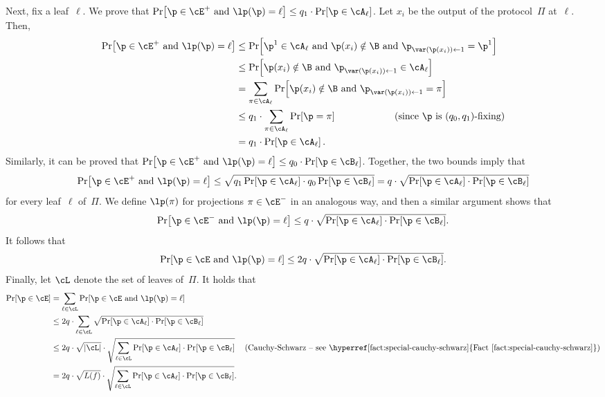 \documentclass[11pt]{article}
\numberwithin{equation}{section}
\theoremstyle{definition}
\theoremstyle{plain}
\newcommand{\expref}[2]{\hyperref[#2]{#1~\ref{#2}}}
\theoremstyle{definition}\newtheorem{notation}[theorem]{Notation}\theoremstyle{plain}
\begin{document}
Next, fix a leaf~$\ell$. We prove that $\Pr\!\left[\p\in\cE^{+}\text{ and }\lp(\p)=\ell\right]\le q_{1}\cdot\Pr\!\left[\p\in\cA_{\ell}\right]$.
Let $x_{i}$ be the output of the protocol~$\Pi$ at~$\ell$. Then,
\begin{align*}
\Pr\!\left[\p\in\cE^{+}\text{ and }\lp(\p)=\ell\right] & \le\Pr\!\left[\p^{1}\in\cA_{\ell}\text{ and }\p(x_{i})\notin\B\text{ and }\p_{\var(\p(x_{i}))\gets1}=\p^{1}\right]\\
 & \le\Pr\!\left[\p(x_{i})\notin\B\text{ and }\p_{\var(\p(x_{i}))\gets1}\in\cA_{\ell}\right]\\
 & =\sum_{\pi\in\cA_{\ell}}\Pr\!\left[\p(x_{i})\notin\B\text{ and }\p_{\var(\p(x_{i}))\gets1}=\pi\right]\\
 & \le q_{1}\cdot\sum_{\pi\in\cA_{\ell}}\Pr\!\left[\p=\pi\right]\qquad\qquad\qquad\text{(since \ensuremath{\p} is \ensuremath{(q_{0},q_{1})}-fixing)}\\
 & =q_{1}\cdot\Pr\!\left[\p\in\cA_{\ell}\right].
\end{align*}
Similarly, it can be proved that $\Pr\!\left[\p\in\cE^{+}\text{ and }\lp(\p)=\ell\right]\le q_{0}\cdot\Pr\!\left[\p\in\cB_{\ell}\right]$.
Together, the two bounds imply that 
\[
\Pr\!\left[\p\in\cE^{+}\text{ and }\lp(\p)=\ell\right]\le\sqrt{q_{1}\Pr\!\left[\p\in\cA_{\ell}\right]\cdot q_{0}\Pr\!\left[\p\in\cB_{\ell}\right]}=q\cdot\sqrt{\Pr\!\left[\p\in\cA_{\ell}\right]\cdot\Pr\!\left[\p\in\cB_{\ell}\right]}
\]
for every leaf~$\ell$ of~$\Pi$. We define $\lp(\pi)$ for projections
$\pi\in\cE^{-}$ in an analogous way, and then a similar argument
shows that 
\[
\Pr\!\left[\p\in\cE^{-}\text{ and }\lp(\p)=\ell\right]\le q\cdot\sqrt{\Pr\!\left[\p\in\cA_{\ell}\right]\cdot\Pr\!\left[\p\in\cB_{\ell}\right]}.
\]
It follows that 
\[
\Pr\!\left[\p\in\cE\text{ and }\lp(\p)=\ell\right]\le2q\cdot\sqrt{\Pr\!\left[\p\in\cA_{\ell}\right]\cdot\Pr\!\left[\p\in\cB_{\ell}\right]}.
\]
Finally, let $\cL$ denote the set of leaves of~$\Pi$. It holds
that 
\begin{align*}
\Pr\!\left[\p\in\cE\right] & =\sum_{\ell\in\cL}\Pr\!\left[\p\in\cE\text{ and }\lp(\p)=\ell\right]\\
 & \le2q\cdot\sum_{\ell\in\cL}\sqrt{\Pr\!\left[\p\in\cA_{\ell}\right]\cdot\Pr\!\left[\p\in\cB_{\ell}\right]}\\
 & \le2q\cdot\sqrt{\left|\cL\right|}\cdot\sqrt{\sum_{\ell\in\cL}\Pr\!\left[\p\in\cA_{\ell}\right]\cdot\Pr\!\left[\p\in\cB_{\ell}\right]} & \text{(Cauchy-Schwarz -- see~\expref{Fact}{fact:special-cauchy-schwarz})}\\
 & =2q\cdot\sqrt{L(f)}\cdot\sqrt{\sum_{\ell\in\cL}\Pr\!\left[\p\in\cA_{\ell}\right]\cdot\Pr\!\left[\p\in\cB_{\ell}\right]}.
\end{align*}
\end{document}
